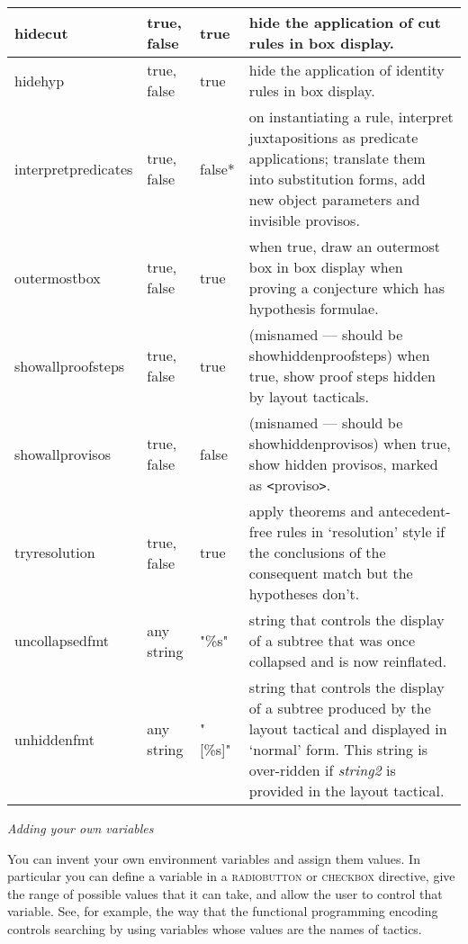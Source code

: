 \begin{tabular}{|p{1.034in}|p{0.635in}|p{0.717in}|p{2.114in}|}
\hline
{\raggedright hidecut} & {\raggedright true, false} & {\raggedright true} & {\raggedright hide the application of cut rules in box display.}\\
\hline
{\raggedright hidehyp} & {\raggedright true, false} & {\raggedright true} & {\raggedright hide the application of identity rules in box display.}\\
\hline
{\raggedright interpretpredicates} & {\raggedright true, false} & {\raggedright false*} & {\raggedright on instantiating a rule, interpret juxtapositions as predicate applications; translate them into substitution forms, add new object parameters and invisible provisos.}\\
\hline
{\raggedright outermostbox} & {\raggedright true, false} & {\raggedright true} & {\raggedright when true, draw an outermost box in box display when proving a conjecture which has hypothesis formulae.}\\
\hline
{\raggedright showallproofsteps} & {\raggedright true, false} & {\raggedright true} & {\raggedright (misnamed --- should be showhiddenproofsteps) when true, show proof steps hidden by layout tacticals.}\\
\hline
{\raggedright showallprovisos} & {\raggedright true, false} & {\raggedright false} & {\raggedright (misnamed --- should be showhiddenprovisos) when true, show hidden provisos, marked as \texttt{<}proviso\texttt{>}.}\\
\hline
{\raggedright tryresolution} & {\raggedright true, false} & {\raggedright true} & {\raggedright apply theorems and antecedent-free rules in `resolution' style if the conclusions of the consequent match but the hypotheses don't.}\\
\hline
{\raggedright uncollapsedfmt} & {\raggedright any string} & {\raggedright "\%s"} & {\raggedright string that controls the display of a subtree that was once collapsed and is now reinflated.}\\
\hline
{\raggedright unhiddenfmt} & {\raggedright any string} & {\raggedright "[\%s]"} & {\raggedright string that controls the display of a subtree produced by the layout tactical and displayed in `normal' form. This string is over-ridden if \textit{string2} is provided in the layout tactical.}\\
\hline \end{tabular}


\textit{Adding your own variables}


You can invent your own environment variables and assign them values. In particular you can define a variable in a \textsc{radiobutton} or \textsc{checkbox} directive, give the range of possible values that it can take, and allow the user to control that variable. See, for example, the way that the functional programming encoding controls searching by using variables whose values are the names of tactics.


